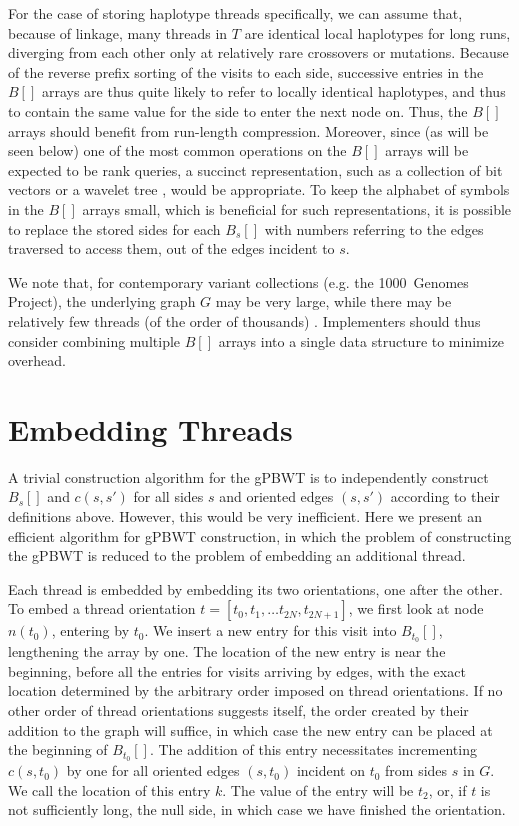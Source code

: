 For the case of storing haplotype threads specifically, we can assume that, because of linkage, many threads in $T$ are identical local haplotypes for long runs, diverging from each other only at relatively rare crossovers or mutations. Because of the reverse prefix sorting of the visits to each side, successive entries in the $B[]$ arrays are thus quite likely to refer to locally identical haplotypes, and thus to contain the same value for the side to enter the next node on. Thus, the $B[]$ arrays should benefit from run-length compression. Moreover, since (as will be seen below) one of the most common operations on the $B[]$ arrays will be expected to be rank queries, a succinct representation, such as a collection of bit vectors or a wavelet tree \cite{grossi2003high}, would be appropriate. To keep the alphabet of symbols in the $B[]$ arrays small, which is beneficial for such representations, it is possible to replace the stored sides for each $B_s[]$ with numbers referring to the edges traversed to access them, out of the edges incident to $s$.

We note that, for contemporary variant collections (e.g. the 1000~Genomes Project), the underlying graph $G$ may be very large, while there may be relatively few threads (of the order of thousands) \cite{10002015global}. Implementers should thus consider combining multiple $B[]$ arrays into a single data structure to minimize overhead.

\section{Embedding Threads}

A trivial construction algorithm for the gPBWT is to independently construct $B_s[]$ and $c(s, s')$ for all sides $s$ and oriented edges $(s, s')$ according to their definitions above. However, this would be very inefficient. Here we present an efficient algorithm for gPBWT construction, in which the problem of constructing the gPBWT is reduced to the problem of embedding an additional thread.

Each thread is embedded by embedding its two orientations, one after the other. To embed a thread orientation $t = [t_0, t_1, \ldots t_{2N}, t_{2N+1}]$, we first look at node $n(t_0)$, entering by $t_0$. We insert a new entry for this visit into $B_{t_0}[]$, lengthening the array by one. The location of the new entry is near the beginning, before all the entries for visits arriving by edges, with the exact location determined by the arbitrary order imposed on thread orientations. If no other order of thread orientations suggests itself, the order created by their addition to the graph will suffice, in which case the new entry can be placed at the beginning of $B_{t_0}[]$. The addition of this entry necessitates incrementing $c(s, t_0)$ by one for all oriented edges $(s, t_0)$ incident on $t_0$ from sides $s$ in $G$. We call the location of this entry $k$. The value of the entry will be $t_2$, or, if $t$ is not sufficiently long, the null side, in which case we have finished the orientation. 

